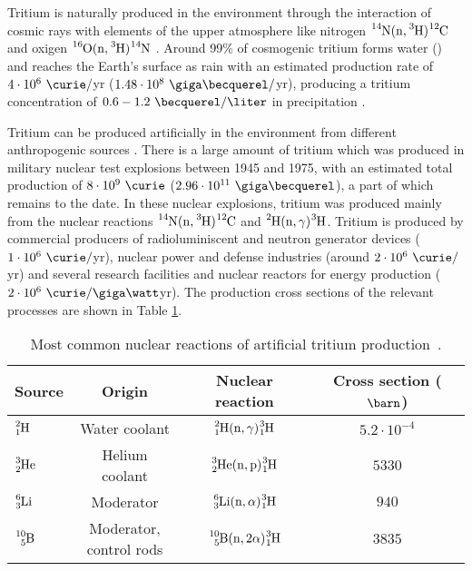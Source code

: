 Tritium is naturally produced in the environment through the interaction of cosmic rays with elements of the upper atmosphere like nitrogen $\ce{^{14}N}(\ce{n},\ce{^{3}H})\ce{^{12}C}$ \cite{TritiumHandling} and oxigen $\ce{^{16}O}(\ce{n},\ce{^{3}H})\ce{^{14}N}$ \cite{OxigenTritium}. Around 99\% of cosmogenic tritium forms water () and reaches the Earth's surface as rain with an estimated production rate of $4\cdot 10^6 ~\curie/$yr ($1.48 \cdot 10^8 ~\giga\becquerel/$yr), producing a tritium concentration of $0.6-1.2~\becquerel/\liter$ in precipitation \cite{CommonEmissionTritium, TritiumHandling}. 

Tritium can be produced artificially in the environment from different anthropogenic sources \cite{CommonEmissionTritium, TritiumHandling}. There is a large amount of tritium which was produced in military nuclear test explosions between 1945 and 1975, with an estimated total production of $8 \cdot 10^9~\curie$ ($2.96 \cdot 10^{11}~\giga\becquerel$), a part of which remains to the date. In these nuclear explosions, tritium was produced mainly from the nuclear reactions $\ce{^{14}N}(\ce{n},\ce{^{3}H})\ce{^{12}C}$ and $\ce{^{2}H}(\ce{n},\gamma)\ce{^{3}H}$. Tritium is produced by commercial producers of radioluminiscent and neutron generator devices ($1 \cdot 10^6~\curie/$yr), nuclear power and defense industries (around $2 \cdot 10^6~\curie/$yr) and several research facilities and nuclear reactors for energy production ($2 \cdot 10^6~\curie/\giga\watt$yr). The production cross sections of the relevant processes are shown in Table \ref{tab:NuclearReactionsTritiumProduction}.

\begin{table}[htbp]
\centering{}%
\begin{tabular}{lccc}
\toprule 
Source & Origin & Nuclear reaction & Cross section ($\barn$)\tabularnewline
\midrule
\midrule 
$\ce{^{2}_{1}H}$ & Water coolant & $\ce{^{2}_{1}H}(\ce{n},\gamma)\ce{^{3}_{1}H}$ & $5.2 \cdot{} 10^{-4}$ \tabularnewline
$\ce{^{3}_{2}He}$ & Helium coolant & $\ce{^{3}_{2}He}(\ce{n},\ce{p})\ce{^{3}_{1}H}$ & $5330$ \tabularnewline
\vspace{0.1cm}$\ce{^{6}_{3}Li}$ & Moderator & $\ce{^{6}_{3}Li}(\ce{n},\alpha)\ce{^{3}_{1}H}$ & $940$ \tabularnewline
$\ce{^{10}_{5}B}$ & \parbox{8em}{\centering Moderator,\\ control rods} & $\ce{^{10}_{5}B}(\ce{n},2\alpha)\ce{^{3}_{1}H}$ & $3835$ \tabularnewline 
\bottomrule
\end{tabular}
\caption{Most common nuclear reactions of artificial tritium production~\cite{CommonEmissionTritium}.}
\label{tab:NuclearReactionsTritiumProduction}
\end{table}

